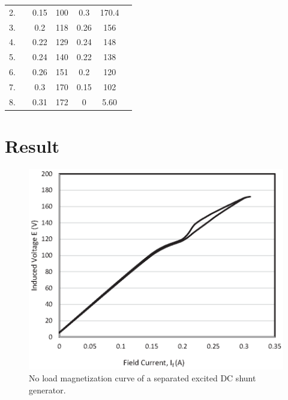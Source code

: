 \begin{table}[hbt!]
\begin{tabular}{|c|c|cc|cc|c|}
2. &                       & \multicolumn{1}{c|}{0.15} & 100  & \multicolumn{1}{c|}{0.3}  & 170.4 &                       \\ \cline{1-1} \cline{3-6}
3. &                       & \multicolumn{1}{c|}{0.2}  & 118  & \multicolumn{1}{c|}{0.26} & 156   &                       \\ \cline{1-1} \cline{3-6}
4. &                       & \multicolumn{1}{c|}{0.22} & 129  & \multicolumn{1}{c|}{0.24} & 148   &                       \\ \cline{1-1} \cline{3-6}
5. &                       & \multicolumn{1}{c|}{0.24} & 140  & \multicolumn{1}{c|}{0.22} & 138   &                       \\ \cline{1-1} \cline{3-6}
6. &                       & \multicolumn{1}{c|}{0.26} & 151  & \multicolumn{1}{c|}{0.2}  & 120   &                       \\ \cline{1-1} \cline{3-6}
7. &                       & \multicolumn{1}{c|}{0.3}  & 170  & \multicolumn{1}{c|}{0.15} & 102   &                       \\ \cline{1-1} \cline{3-6}
8. &                       & \multicolumn{1}{c|}{0.31} & 172  & \multicolumn{1}{c|}{0}    & 5.60  &                       \\ \hline
\end{tabular}

\end{table}


\newpage
\FloatBarrier
\section{Result} 
\begin{figure}[hbt!]
\vspace{0mm}
    \centerline{\includegraphics[width=1.2\textwidth]{Figures/Exp02/Book1.eps}}
    \vspace{0mm}
    \caption{No load magnetization curve of a separated excited DC shunt generator.}
    \label{fig:figg3}
\end{figure}
\vspace{20mm}




